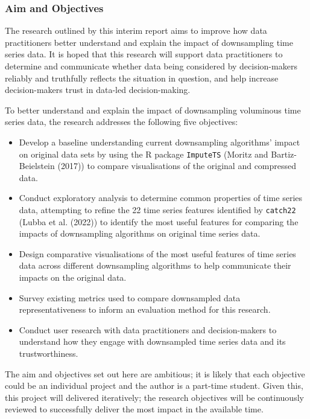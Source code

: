 \documentclass[
]{article}
\begin{document}
\hypertarget{aim-and-objectives}{%
\subsubsection{Aim and Objectives}\label{aim-and-objectives}}

The research outlined by this interim report aims to improve how data
practitioners better understand and explain the impact of downsampling
time series data. It is hoped that this research will support data
practitioners to determine and communicate whether data being considered
by decision-makers reliably and truthfully reflects the situation in
question, and help increase decision-makers trust in data-led
decision-making.

To better understand and explain the impact of downsampling voluminous
time series data, the research addresses the following five objectives:

\begin{itemize}
\item
  Develop a baseline understanding current downsampling algorithms'
  impact on original data sets by using the R package \texttt{ImputeTS}
  (Moritz and Bartiz-Beielstein (2017)) to compare visualisations of the
  original and compressed data.
\item
  Conduct exploratory analysis to determine common properties of time
  series data, attempting to refine the 22 time series features
  identified by \texttt{catch22} (Lubba et al. (2022)) to identify the
  most useful features for comparing the impacts of downsampling
  algorithms on original time series data.
\item
  Design comparative visualisations of the most useful features of time
  series data across different downsampling algorithms to help
  communicate their impacts on the original data.
\item
  Survey existing metrics used to compare downsampled data
  representativeness to inform an evaluation method for this research.
\item
  Conduct user research with data practitioners and decision-makers to
  understand how they engage with downsampled time series data and its
  trustworthiness.
\end{itemize}

The aim and objectives set out here are ambitious; it is likely that
each objective could be an individual project and the author is a
part-time student. Given this, this project will delivered iteratively;
the research objectives will be continuously reviewed to successfully
deliver the most impact in the available time.
\end{document}
